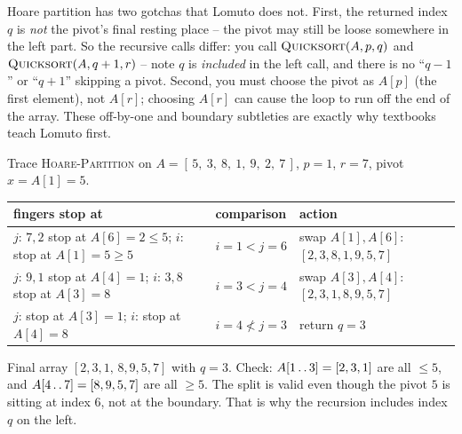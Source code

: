 \begin{trapbox}
Hoare partition has two gotchas that Lomuto does not. First, the returned index
$q$ is \emph{not} the pivot's final resting place -- the pivot may still be
loose somewhere in the left part. So the recursive calls differ: you call
$\textsc{Quicksort}(A, p, q)$ and $\textsc{Quicksort}(A, q+1, r)$ -- note $q$ is
\emph{included} in the left call, and there is no ``$q-1$'' or ``$q+1$''
skipping a pivot. Second, you must choose the pivot as $A[p]$ (the first
element), not $A[r]$; choosing $A[r]$ can cause the loop to run off the end of
the array. These off-by-one and boundary subtleties are exactly why textbooks
teach Lomuto first.
\end{trapbox}

\begin{labbox}
Trace \textsc{Hoare-Partition} on $A = [\,5,\ 3,\ 8,\ 1,\ 9,\ 2,\ 7\,]$,
$p=1$, $r=7$, pivot $x = A[1] = 5$.

\medskip
{\small\setlength{\tabcolsep}{4pt}
\begin{tabular}{lll}
\toprule
fingers stop at & comparison & action \\
\midrule
$j$: $7,2$ stop at $A[6]{=}2 \le 5$; $i$: stop at $A[1]{=}5 \ge 5$ & $i{=}1 < j{=}6$ & swap $A[1],A[6]$: $[2,3,8,1,9,5,7]$ \\
$j$: $9,1$ stop at $A[4]{=}1$; $i$: $3,8$ stop at $A[3]{=}8$ & $i{=}3 < j{=}4$ & swap $A[3],A[4]$: $[2,3,1,8,9,5,7]$ \\
$j$: stop at $A[3]{=}1$; $i$: stop at $A[4]{=}8$ & $i{=}4 \not< j{=}3$ & return $q = 3$ \\
\bottomrule
\end{tabular}}

\medskip
Final array $[2,3,1,\,8,9,5,7]$ with $q=3$. Check: $A[1\mathinner{\ldotp\ldotp} 3]=[2,3,1]$ are all
$\le 5$, and $A[4 \mathinner{\ldotp\ldotp} 7]=[8,9,5,7]$ are all $\ge 5$. The split is valid even
though the pivot $5$ is sitting at index $6$, not at the boundary. That is why
the recursion includes index $q$ on the left.
\end{labbox}

